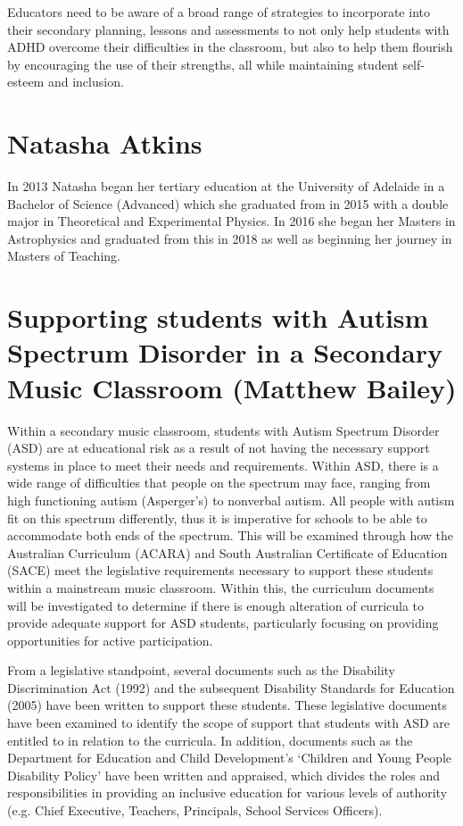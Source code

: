 \documentclass[twoside,14pt,a4paper,notitlepage]{memoir}
\begin{document}
Educators need to be aware of a broad range of strategies to incorporate into their secondary planning, lessons and assessments to not only help students with ADHD overcome their difficulties in the classroom, but also to help them flourish by encouraging the use of their strengths, all while maintaining student self-esteem and inclusion.

\section*{Natasha Atkins}

In 2013 Natasha began her tertiary education at the University of Adelaide in a Bachelor of Science (Advanced) which she graduated from in 2015 with a double major in Theoretical and Experimental Physics. In 2016 she began her Masters in Astrophysics and graduated from this in 2018 as well as beginning her journey in Masters of Teaching.



\section*{Supporting students with Autism Spectrum Disorder in a Secondary Music Classroom (Matthew Bailey)}
\label{aut:bailey}

Within a secondary music classroom, students with Autism Spectrum Disorder (ASD) are at educational risk as a result of not having the necessary support systems in place to meet their needs and requirements. Within ASD, there is a wide range of difficulties that people on the spectrum may face, ranging from high functioning autism (Asperger’s) to nonverbal autism. All people with autism fit on this spectrum differently, thus it is imperative for schools to be able to accommodate both ends of the spectrum. This will be examined through how the Australian Curriculum (ACARA) and South Australian Certificate of Education (SACE) meet the legislative requirements necessary to support these students within a mainstream music classroom. Within this, the curriculum documents will be investigated to determine if there is enough alteration of curricula to provide adequate support for ASD students, particularly focusing on providing opportunities for active participation.

From a legislative standpoint, several documents such as the Disability Discrimination Act (1992) and the subsequent Disability Standards for Education (2005) have been written to support these students. These legislative documents have been examined to identify the scope of support that students with ASD are entitled to in relation to the curricula. In addition, documents such as the Department for Education and Child Development’s ‘Children and Young People Disability Policy’ have been written and appraised, which divides the roles and responsibilities in providing an inclusive education for various levels of authority (e.g. Chief Executive, Teachers, Principals, School Services Officers).
\end{document}
